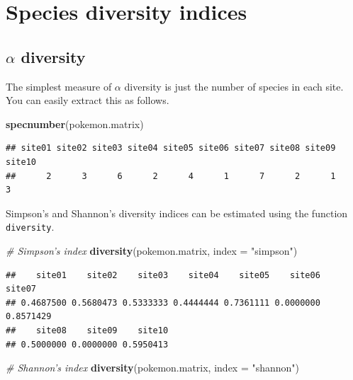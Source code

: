\documentclass[]{book}
\newenvironment{Shaded}{\begin{snugshade}}{\end{snugshade}}
\newcommand{\KeywordTok}[1]{\textcolor[rgb]{0.13,0.29,0.53}{\textbf{{#1}}}}
\newcommand{\DataTypeTok}[1]{\textcolor[rgb]{0.13,0.29,0.53}{{#1}}}
\newcommand{\StringTok}[1]{\textcolor[rgb]{0.31,0.60,0.02}{{#1}}}
\newcommand{\CommentTok}[1]{\textcolor[rgb]{0.56,0.35,0.01}{\textit{{#1}}}}
\newcommand{\NormalTok}[1]{{#1}}
\begin{document}
\section{Species diversity indices}\label{species-diversity-indices}

\subsection{\texorpdfstring{\(\alpha\)
diversity}{\textbackslash{}alpha diversity}}\label{alpha-diversity}

The simplest measure of \(\alpha\) diversity is just the number of
species in each site. You can easily extract this as follows.

\begin{Shaded}
\begin{Highlighting}[]
\KeywordTok{specnumber}\NormalTok{(pokemon.matrix)}
\end{Highlighting}
\end{Shaded}

\begin{verbatim}
## site01 site02 site03 site04 site05 site06 site07 site08 site09 site10 
##      2      3      6      2      4      1      7      2      1      3
\end{verbatim}

Simpson's and Shannon's diversity indices can be estimated using the
function \texttt{diversity}.

\begin{Shaded}
\begin{Highlighting}[]
\CommentTok{# Simpson's index}
\KeywordTok{diversity}\NormalTok{(pokemon.matrix, }\DataTypeTok{index =} \StringTok{"simpson"}\NormalTok{)}
\end{Highlighting}
\end{Shaded}

\begin{verbatim}
##    site01    site02    site03    site04    site05    site06    site07 
## 0.4687500 0.5680473 0.5333333 0.4444444 0.7361111 0.0000000 0.8571429 
##    site08    site09    site10 
## 0.5000000 0.0000000 0.5950413
\end{verbatim}

\begin{Shaded}
\begin{Highlighting}[]
\CommentTok{# Shannon's index}
\KeywordTok{diversity}\NormalTok{(pokemon.matrix, }\DataTypeTok{index =} \StringTok{"shannon"}\NormalTok{)}
\end{Highlighting}
\end{Shaded}
\end{document}
